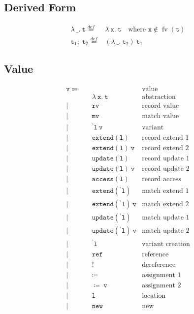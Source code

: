 \documentclass{report}
\newcommand{\code}{\mathtt}
\newcommand{\backtick}{{}^{\backprime}}
\DeclareMathOperator{\freeVariable}{fv}
\newcommand{\definedAs}{\stackrel{def}{=}}
\newcommand{\sequencing}{;\;}
\begin{document}
\subsection{Derived Form}

\begin{align*}
\lambda\ \_ .\ \code{t} \definedAs & \lambda\ \code{x}.\ \code{t} \quad \text{where \(\code{x} \not\in \freeVariable(\code{t})\)} \\
\code{t}_1\sequencing\code{t}_2 \definedAs & (\lambda\ \_ .\ \code{t}_2)\ \code{t}_1
\end{align*}

\subsection{Value}

\begin{align*}
\code{v} \Coloneqq \quad & & \text{value} \\
& \code{\lambda\ x.\ t} & \text{abstraction} \\
| \quad & \code{rv} & \text{record value} \\
| \quad & \code{mv} & \text{match value} \\
| \quad & \code{\backtick l\ v} & \text{variant} \\
| \quad & \code{extend(l)} & \text{record extend 1} \\
| \quad & \code{extend(l)\ v} & \text{record extend 2} \\
| \quad & \code{update(l)} & \text{record update 1} \\
| \quad & \code{update(l)\ v} & \text{record update 2} \\
| \quad & \code{access(l)} & \text{record access} \\
| \quad & \code{extend(\backtick l)} & \text{match extend 1} \\
| \quad & \code{extend(\backtick l)\ v} & \text{match extend 2} \\
| \quad & \code{update(\backtick l)} & \text{match update 1} \\
| \quad & \code{update(\backtick l)\ v} & \text{match update 2} \\
| \quad & \code{\backtick l} & \text{variant creation} \\
| \quad & \code{ref} & \text{reference} \\
| \quad & \code{!} & \text{dereference} \\
| \quad & \code{\coloneqq} & \text{assignment 1} \\
| \quad & \code{\coloneqq\ v} & \text{assignment 2} \\
| \quad & \code{l} & \text{location} \\
| \quad & \code{new} & \text{new}
\end{align*}
\end{document}
